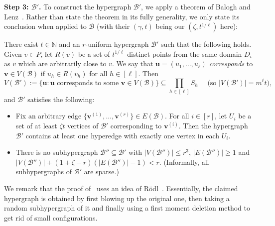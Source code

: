 \documentclass[10pt,a4paper]{article}
\newcounter{propcounter}
\newcommand{\V}[1]{\mathbold{#1}}
\theoremstyle{definition}
\newcommand{\cB}{\mathcal{B}}
\newcommand{\cG}{\mathcal{G}}
\begin{document}
\medskip
\noindent
\textbf{Step 3: $\cB'$.}		
To construct the hypergraph $\cB'$, we apply a theorem of Balogh and Lenz~\cite[Theorem~16]{BL-1}.
Rather than state the theorem in its fully generality, we only state its conclusion when applied to $\cB$ (with their $(\gamma, t)$ being our $(\zeta, t^{1/\ell})$ here):

There exist $t \in \mathbb{N}$ and an $r$-uniform hypergraph $\cB'$ such that the following holds.
Given $v \in P$, let $R(v)$ be a set of $t^{1/\ell}$ distinct points from the same domain $D_i$ as $v$ which are arbitrarily close to $v$.
We say that $\V{u} = (u_1,\ldots,u_{\ell})$ \emph{corresponds} to $\V{v} \in V(\cB)$ if $u_h \in R(v_h)$ for all $h \in [\ell]$. 
Then
$$
V(\cB') := \{\V{u} : \V{u} \text{ corresponds to some } \V{v} \in V(\cB)\} \subseteq \prod_{h \in [\ell]}S_h
\quad\text{ (so }|V(\cB')| = m^\ell t),
$$
and $\cB'$ satisfies the following:	
\begin{itemize}
	\item Fix an arbitrary edge $\lbrace \V{v}^{(1)},\ldots, \V{v}^{(r)}\rbrace\in E(\cB)$. For all $i\in [r]$, let $U_i$ be a set of at least $\zeta t$ vertices of $\cB'$ corresponding to $\V{v}^{(i)}$. Then the hypergraph $\cB'$ contains at least one hyperedge with exactly one vertex in each $U_i$. 
	\item There is no subhypergraph $\cB''\subseteq \cB'$ with $|V(\cB'')|\le r^3$, $|E(\cB'')| \geq 1$ and $|V(\cB'')|+(1+\zeta-r)(|E(\cB'')|-1)<r$. (Informally, all subhypergraphs of $\cB'$ are sparse.) 
\end{itemize}

We remark that the proof of~\cite[Theorem~16]{BL-1} uses an idea of R\"odl~\cite{Rodl}. Essentially, the claimed hypergraph is obtained by first blowing up the original one, then taking a random subhypergraph of it and finally using a first moment deletion method to get rid of small configurations.

\end{document}

